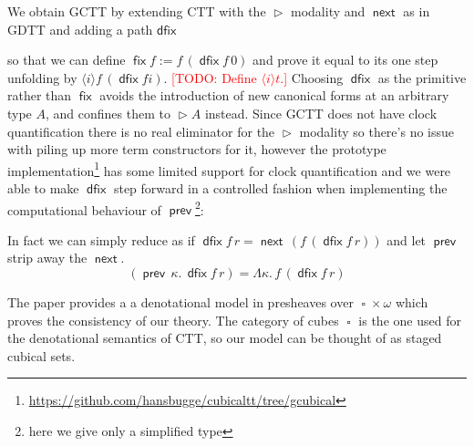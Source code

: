 \documentclass{book}
\newcommand{\TODO}[1]{\textcolor{red}{[TODO: #1]}}
\DeclareMathOperator{\fix}{\mathsf{fix}}
\DeclareMathOperator{\Later}{\vartriangleright}
\DeclareMathOperator{\dfix}{\mathsf{dfix}}
\DeclareMathOperator{\prev}{\mathsf{prev}}
\DeclareMathOperator{\next}{\ensuremath{\mathsf{next}}}
\DeclareMathOperator{\Cube}{\square}
\newcommand{\sd}{.\,}
\begin{document}
  We obtain GCTT by extending CTT with the $\Later$ modality and $\next$ as in GDTT and adding a path $\mathsf{dfix}$
  so that we can define $\fix f := f\,(\dfix f\,0)$ and prove it
  equal to its one step unfolding by $\langle i \rangle f\,(\dfix f i)$.
  \TODO{Define $\langle i \rangle t$.}
  Choosing $\dfix$ as the primitive rather than $\fix$ avoids the
  introduction of new canonical forms at an arbitrary type $A$, and
  confines them to $\Later A$ instead.
  Since GCTT does not have clock quantification there is no real
  eliminator for the $\Later$ modality so there's no issue with piling
  up more term constructors for it, however the prototype
  implementation\footnote{\url{https://github.com/hansbugge/cubicaltt/tree/gcubical}} has some limited support for clock
  quantification and we were able to make $\dfix$ step forward in a
  controlled fashion when implementing the computational behaviour of
  $\prev$\footnote{here we give only a simplified type}:
  In fact we can simply reduce as if $\dfix f\,r = \next\,(f\,(\dfix f\,r))$ and let $\prev$ strip away the $\next$.
  \[
    (\prev\,\kappa\sd \dfix f\,r) = \Lambda \kappa\sd f\,(\dfix f\,r)
  \]

  The paper provides a a denotational model in presheaves over $\Cube
  \times \omega$ which proves the consistency of our theory.
  The category of cubes $\Cube$ is the one used for the denotational
  semantics of CTT, so our model can be thought of as staged cubical sets.
\end{document}
